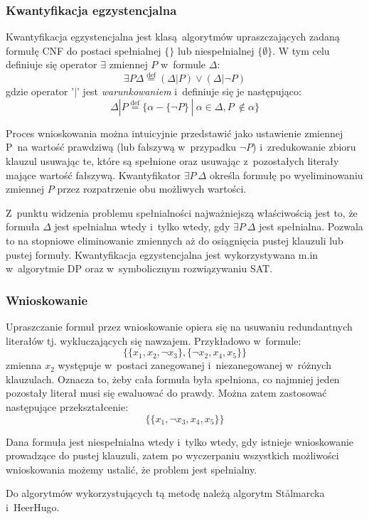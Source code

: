 \subsubsection{Kwantyfikacja egzystencjalna}
Kwantyfikacja egzystencjalna jest klasą algorytmów upraszczających zadaną formułę CNF do postaci spełnialnej $\{\}$ lub niespełnialnej $\{\emptyset\}$.
W tym celu definiuje się operator $\exists$ zmiennej $P$ w~formule $\Delta$:
\[ \exists P \Delta \stackrel{\text{def}}{=} (\Delta | P) \lor (\Delta | \neg P) \]
gdzie operator '$|$' jest \textit{warunkowaniem} i~definiuje się je następująco:
\[ \Delta | P \stackrel{\text{def}}{=} \{\alpha - \{\neg P\}~|~\alpha \in \Delta, P~\notin \alpha\} \]

Proces wnioskowania można intuicyjnie przedstawić jako ustawienie zmiennej P~na wartość prawdziwą (lub fałszywą w~przypadku $\neg P$)
i~zredukowanie zbioru klauzul usuwając te, które są spełnione oraz usuwając z~pozostałych literały mające wartość fałszywą.
Kwantyfikator $\exists P~\Delta $ określa formułę po wyeliminowaniu zmiennej $P$ przez rozpatrzenie obu możliwych wartości.

Z~punktu widzenia problemu spełnialności najważniejszą właściwością jest to, że formuła $\Delta$ jest spełnialna wtedy i~tylko wtedy, gdy 
$\exists P~\Delta$ jest spełnialna. Pozwala to na stopniowe eliminowanie zmiennych aż do osiągnięcia pustej klauzuli lub pustej formuły. 
Kwantyfikacja egzystencjalna jest wykorzystywana m.in w~algorytmie DP oraz w~symbolicznym rozwiązywaniu SAT.

\subsubsection{Wnioskowanie}
Upraszczanie formuł przez wnioskowanie opiera się na usuwaniu redundantnych literałów tj. wykluczających się nawzajem.
Przykładowo w~formule:
\[ \{\{x_1, x_2, \neg x_3 \},  \{ \neg x_2, x_4, x_5 \}\} \]
zmienna $x_2$ występuje w~postaci zanegowanej i~niezanegowanej w~różnych klauzulach. Oznacza to, żeby cała formuła była spełniona,
co najmniej jeden pozostały literał musi się ewaluować do prawdy. Można zatem zastosować następujące przekształcenie:
  \[ \{\{x_1, \neg x_3, x_4, x_5 \}\} \]
  
Dana formuła jest niespełnialna wtedy i~tylko wtedy, gdy istnieje wnioskowanie prowadzące do pustej klauzuli, zatem po wyczerpaniu
wszystkich możliwości wnioskowania możemy ustalić, że problem jest spełnialny. 

Do algorytmów wykorzystujących tą metodę należą algorytm St{\aa}lmarcka i~HeerHugo.


